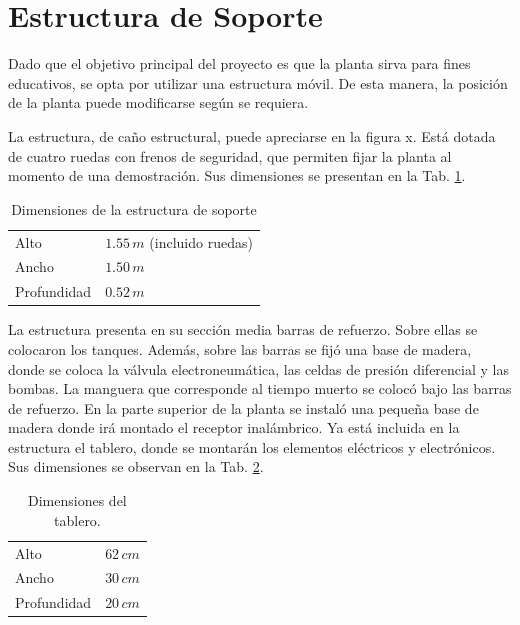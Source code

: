 \section{Estructura de Soporte}
\label{sec:EstructuraSoporte}

Dado que el objetivo principal del proyecto es que la planta sirva para fines
educativos, se opta por utilizar una estructura móvil.
De esta manera, la posición de la planta puede modificarse según se requiera.

La estructura, de caño estructural, puede apreciarse en la figura x.
Está dotada de cuatro ruedas con frenos de seguridad, que permiten fijar la
planta al momento de una demostración.
Sus dimensiones se presentan en la Tab. \ref{tab:dimensionesEstructura}.

\begin{table}
\centering
\begin{tabular}{|l|l|}
\hline
Alto & $1.55\,m$ (incluido ruedas)\\
Ancho &  $1.50\,m$\\
Profundidad &  $0.52\,m$\\
\hline
\end{tabular}
\caption{Dimensiones de la estructura de soporte}
\label{tab:dimensionesEstructura}
\end{table}
 
La estructura presenta en su sección media barras de refuerzo.
Sobre ellas se colocaron los tanques.
Además, sobre las barras se fijó una base de madera, donde se coloca la
válvula electroneumática, las celdas de presión diferencial
y las bombas.
La manguera que corresponde al tiempo muerto se colocó bajo
las barras de refuerzo.
En la parte superior de la planta se instaló una pequeña base de
madera donde irá montado el receptor inalámbrico.
Ya está incluida en la estructura el tablero, donde se
montarán los elementos eléctricos y electrónicos.
Sus dimensiones se observan en la Tab. \ref{tab:dimensionesTablero}.

\begin{table}
\centering
\begin{tabular}{|l|l|}
\hline
Alto & $62\,cm$\\
Ancho &  $30\,cm$\\
Profundidad &  $20\,cm$\\
\hline
\end{tabular}
\caption{Dimensiones del tablero.}
\label{tab:dimensionesTablero}
\end{table}

